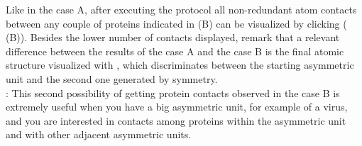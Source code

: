 \begin{itemize}
Like in the case A, after executing the protocol all non-redundant atom contacts between any couple of proteins indicated in  (B) can be visualized by clicking  ( (B)). Besides the lower number of contacts displayed, remark that a relevant difference between the results of the case A and the case B is the final atomic structure visualized with \chimera, which discriminates between the starting asymmetric unit and the second one generated by symmetry.\\
 
: This second possibility of getting protein contacts observed in the case B is extremely useful when you have a big asymmetric unit, for example of a virus, and you are interested in contacts among proteins within the asymmetric unit and with other adjacent asymmetric units.
\end{itemize}















